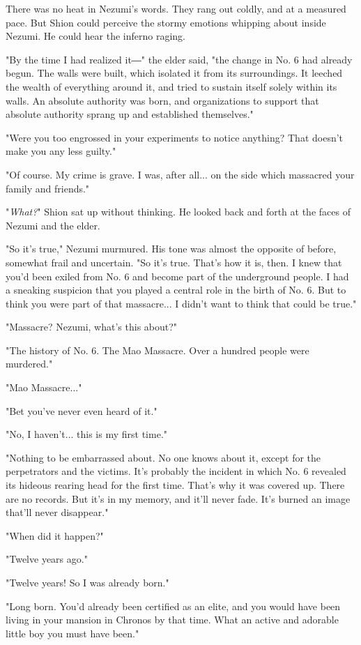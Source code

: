 There was no heat in Nezumi's words. They rang out coldly, and at a
measured pace. But Shion could perceive the stormy emotions whipping
about inside Nezumi. He could hear the inferno raging.

"By the time I had realized it―" the elder said, "the change in No. 6
had already begun. The walls were built, which isolated it from its
surroundings. It leeched the wealth of everything around it, and tried
to sustain itself solely within its walls. An absolute authority was
born, and organizations to support that absolute authority sprang up and
established themselves."

"Were you too engrossed in your experiments to notice anything? That
doesn't make you any less guilty."

"Of course. My crime is grave. I was, after all... on the side which
massacred your family and friends."

"\emph{What?}" Shion sat up without thinking. He looked back and forth at the
faces of Nezumi and the elder.

"So it's true," Nezumi murmured. His tone was almost the opposite of
before, somewhat frail and uncertain. "So it's true. That's how it is,
then. I knew that you'd been exiled from No. 6 and become part of the
underground people. I had a sneaking suspicion that you played a central
role in the birth of No. 6. But to think you were part of that
massacre... I didn't want to think that could be true."

"Massacre? Nezumi, what's this about?"

"The history of No. 6. The Mao Massacre. Over a hundred people were
murdered."

"Mao Massacre..."

"Bet you've never even heard of it."

"No, I haven't... this is my first time."

"Nothing to be embarrassed about. No one knows about it, except for the
perpetrators and the victims. It's probably the incident in which No. 6
revealed its hideous rearing head for the first time. That's why it was
covered up. There are no records. But it's in my memory, and it'll never
fade. It's burned an image that'll never disappear."

"When did it happen?"

"Twelve years ago."

"Twelve years! So I was already born."

"Long born. You'd already been certified as an elite, and you would have
been living in your mansion in Chronos by that time. What an active and
adorable little boy you must have been."

